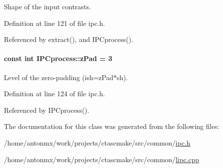Shape of the input contrasts. 



Definition at line 121 of file ipc.h.



Referenced by extract(), and IPCprocess().

\hypertarget{classIPCprocess_a5cb65961fa5a3aa40ae93f67f761ff87}{
\paragraph[{zPad}]{\setlength{\rightskip}{0pt plus 5cm}const int {\bf IPCprocess::zPad} = 3}\hfill}
\label{classIPCprocess_a5cb65961fa5a3aa40ae93f67f761ff87}


Level of the zero-\/padding (ish=zPad$\ast$sh). 



Definition at line 124 of file ipc.h.



Referenced by IPCprocess().



The documentation for this class was generated from the following files:\begin{DoxyCompactItemize}
\item 
/home/antonmx/work/projects/ctascmake/src/common/\hyperlink{ipc_8h}{ipc.h}\item 
/home/antonmx/work/projects/ctascmake/src/common/\hyperlink{lipc_8cpp}{lipc.cpp}\end{DoxyCompactItemize}
